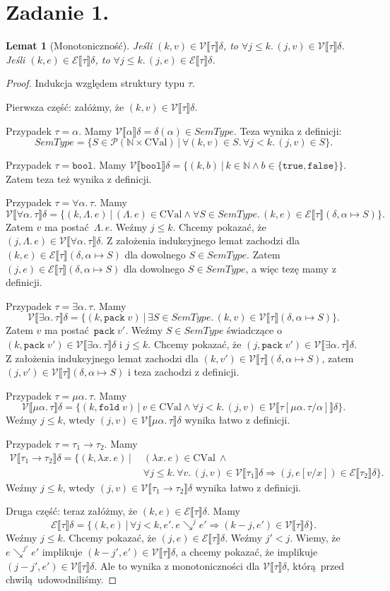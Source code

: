 \documentclass[a4paper, 12pt]{article}
\title{}
\author{Wiktor Kuchta}
\date{\vspace{-4ex}}
\newcommand{\E}{\mathcal{E}}
\newcommand{\V}{\mathcal{V}}
\newcommand{\bool}{\mathtt{bool}}
\newcommand{\true}{\mathtt{true}}
\newcommand{\false}{\mathtt{false}}
\newcommand{\pack}{\mathtt{pack}}
\newcommand{\fold}{\mathtt{fold}}
\newcommand{\CVal}{\mathrm{CVal}}
\newcommand{\SemType}{\textit{SemType}}
\newtheorem{lemat}{Lemat}
\begin{document}
\maketitle

\section*{Zadanie 1.}

\begin{lemat}[Monotoniczność]
	Jeśli $(k,v) ∈ \V⟦τ⟧ δ$,
	to $∀j≤k.\,(j,v) ∈ \V⟦τ⟧δ$.
	Jeśli $(k,e) ∈ \E⟦τ⟧δ$, to $∀j≤k.\,(j,e) ∈ \E⟦τ⟧δ$.
\end{lemat}

\begin{proof}

Indukcja względem struktury typu $τ$.

Pierwsza część: załóżmy, że $(k,v) ∈ \V⟦τ⟧δ$.

Przypadek $τ=α$. Mamy $\V⟦α⟧δ = δ(α) ∈ \SemType$.
Teza wynika z definicji: $$\SemType =
\{S ∈ \mathcal{P}(ℕ × \CVal) │ ∀(k, v) ∈ S.\,∀j < k.\,(j,v) ∈ S\}.$$

Przypadek $τ=\bool$. Mamy $\V⟦\bool⟧δ = \{(k,b) │ k ∈ ℕ ∧ b ∈ \{\true, \false\}\}$.
Zatem teza też wynika z definicji.

Przypadek $τ=∀α.\,τ$. Mamy
$$\V⟦∀α.\,τ⟧δ = \{(k, Λ.\,e) │ (Λ.\,e) ∈ \CVal ∧ ∀S ∈ \SemType.\,(k,e) ∈ \E⟦τ⟧(δ, α↦S)\}.$$
Zatem $v$ ma postać $Λ.\,e$. Weźmy $j≤k$. Chcemy pokazać, że
$(j, Λ.\,e) ∈ \V⟦∀α.\,τ⟧δ$.
Z założenia indukcyjnego lemat zachodzi dla $(k,e) ∈ \E⟦τ⟧(δ, α↦S)$ dla dowolnego $S ∈ \SemType$.
Zatem $(j,e) ∈ \E⟦τ⟧(δ, α↦S)$ dla dowolnego $S ∈ \SemType$,
a więc tezę mamy z definicji.

Przypadek $τ=∃α.\,τ$. Mamy
$$\V⟦∃α.\,τ⟧δ = \{(k, \pack\;v) │ ∃S ∈ \SemType.\,(k,v) ∈ \V⟦τ⟧(δ, α↦S)\}.$$
Zatem $v$ ma postać $\pack\;v'$.
Weźmy $S∈\SemType$ świadczące o $(k, \pack\;v') ∈ \V⟦∃α.\,τ⟧δ$
i $j≤k$.
Chcemy pokazać, że $(j,\pack\;v') ∈ \V⟦∃α.\,τ⟧δ$.
Z założenia indukcyjnego lemat zachodzi dla $(k,v') ∈ \V⟦τ⟧(δ, α↦S)$,
zatem $(j,v') ∈ \V⟦τ⟧(δ, α↦S)$ i teza zachodzi z definicji.

Przypadek $τ=μα.\,τ$. Mamy
$$\V⟦μα.\,τ⟧δ = \{(k, \fold\;v) │ v ∈ \CVal ∧ ∀j<k.\,(j,v) ∈ \V⟦τ[μα.\,τ/α]⟧δ\}.$$
Weźmy $j≤k$, wtedy $(j, v) ∈ \V⟦μα.\,τ⟧δ$ wynika łatwo z definicji.

Przypadek $τ=τ_1 → τ_2$. Mamy
\begin{align*}
	\V⟦τ_1 → τ_2⟧δ = \{(k, λx.\,e) │\ &(λx.\,e) ∈ \CVal \ ∧ \\ &∀j ≤ k.\,∀v.\,(j,v) ∈ \V⟦τ_1⟧δ ⇒ (j, e[v/x]) ∈ \E⟦τ_2⟧δ\}.
\end{align*}
Weźmy $j≤k$, wtedy $(j, v) ∈ \V⟦τ_1 → τ_2⟧δ$ wynika łatwo z definicji.

Druga część: teraz załóżmy, że $(k, e) ∈ \E⟦τ⟧δ$.
Mamy
$$\E⟦τ⟧δ = \{(k, e) │ ∀j<k, e'.\,e \searrow^j e' ⇒ (k-j, e') ∈ \V⟦τ⟧δ\}.$$
Weźmy $j≤k$.
Chcemy pokazać, że $(j,e) ∈ \E⟦τ⟧δ$.
Weźmy $j' < j$.
Wiemy, że $e \searrow^{j'} e'$ implikuje $(k-j', e') ∈ \V⟦τ⟧δ$,
a chcemy pokazać, że implikuje $(j-j', e') ∈ \V⟦τ⟧δ$.
Ale to wynika z monotoniczności dla $\V⟦τ⟧δ$, którą przed chwilą udowodniliśmy.

\end{proof}
\end{document}
